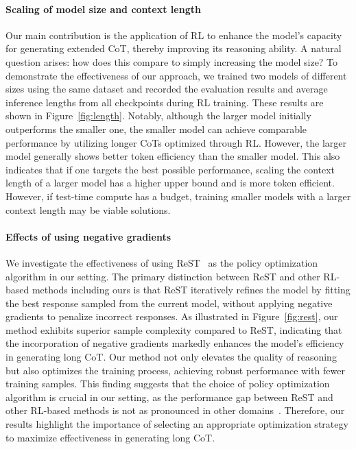\documentclass{article}
\newcommand{\citep}[1]{\parencite{#1}}
\begin{document}
\paragraph{Scaling of model size and context length} 


Our main contribution is the application of RL to enhance the model's capacity for generating extended CoT, thereby improving its reasoning ability. 
A natural question arises: how does this compare to simply increasing the model size? To demonstrate the effectiveness of our approach, we trained two models of different sizes using the same dataset and recorded the evaluation results and average inference lengths from all checkpoints during RL training. These results are shown in Figure~\ref{fig:length}. Notably, although the larger model initially outperforms the smaller one, the smaller model can achieve comparable performance by utilizing longer CoTs optimized through RL. However, the larger model generally shows better token efficiency than the smaller model. 
This also indicates that if one targets the best possible performance, scaling the context length of a larger model has a higher upper bound and is more token efficient. However, if test-time compute has a budget, training smaller models with a larger context length may be viable solutions.

\paragraph{Effects of using negative gradients} 
We investigate the effectiveness of using ReST~\citep{gulcehre2023reinforced} as the policy optimization algorithm in our setting. 
The primary distinction between  ReST and other RL-based methods including ours is that ReST iteratively refines the model by fitting the best response sampled from the current model, without applying negative gradients to penalize incorrect responses. 
As illustrated in Figure~\ref{fig:rest}, our method exhibits superior sample complexity compared to ReST, indicating that the incorporation of negative gradients markedly enhances the model's efficiency in generating long CoT. Our method not only elevates the quality of reasoning but also optimizes the training process, achieving robust performance with fewer training samples. 
This finding suggests that the choice of policy optimization algorithm is crucial in our setting, as the performance gap between ReST and other RL-based methods is not as pronounced in other domains~\citep{gulcehre2023reinforced}. Therefore, our results highlight the importance of selecting an appropriate optimization strategy to maximize effectiveness in generating long CoT.
\end{document}
